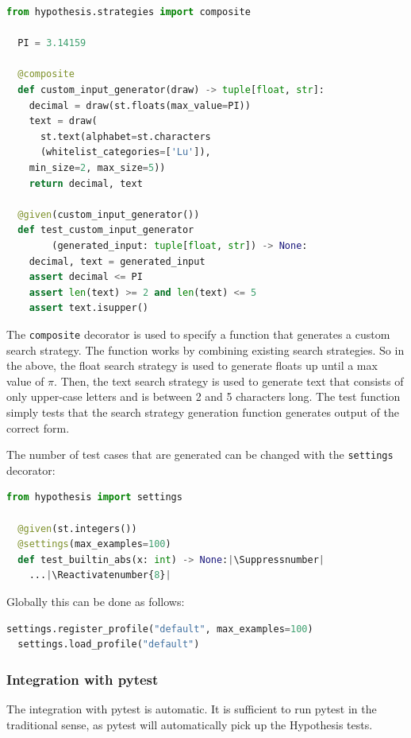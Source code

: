 \documentclass[runningheads]{llncs}
\makeatletter
\let\origthelstnumber\thelstnumber
\newcommand*\Suppressnumber{%
  \lst@AddToHook{OnNewLine}{%
    \let\thelstnumber\relax%
     \advance\c@lstnumber-\@ne\relax%
    }%
}
\newcommand*\Reactivatenumber[1]{%
  \setcounter{lstnumber}{\numexpr#1-1\relax}
  \lst@AddToHook{OnNewLine}{%
   \let\thelstnumber\origthelstnumber%
   \refstepcounter{lstnumber}%
  }%
}
\makeatother
\begin{document}
\begin{lstlisting}[language=Python,caption={Complex Inputs from code/tutorial.ipynb}]
  from hypothesis.strategies import composite

  PI = 3.14159

  @composite
  def custom_input_generator(draw) -> tuple[float, str]:
    decimal = draw(st.floats(max_value=PI))
    text = draw(
      st.text(alphabet=st.characters
      (whitelist_categories=['Lu']), 
    min_size=2, max_size=5))
    return decimal, text

  @given(custom_input_generator())
  def test_custom_input_generator
        (generated_input: tuple[float, str]) -> None:
    decimal, text = generated_input
    assert decimal <= PI
    assert len(text) >= 2 and len(text) <= 5
    assert text.isupper()
\end{lstlisting}
The \texttt{composite} decorator is used to specify a function that generates a custom search strategy. The function works by combining existing search strategies. So in the above, the float search strategy is used to generate floats up until a max value of $\pi$. Then, the text search strategy is used to generate text that consists of only upper-case letters and is between 2 and 5 characters long. The test function simply tests that the search strategy generation function generates output of the correct form.

\vspace{5mm}
\noindent The number of test cases that are generated can be changed with the \texttt{settings} decorator:

\begin{lstlisting}[language=Python,caption={??? from code/tutorial.ipynb}]
  from hypothesis import settings

  @given(st.integers())
  @settings(max_examples=100)
  def test_builtin_abs(x: int) -> None:|\Suppressnumber|
    ...|\Reactivatenumber{8}|

\end{lstlisting}

\noindent Globally this can be done as follows:
\begin{lstlisting}[language=Python,caption={??? from code/tutorial.ipynb}]
  settings.register_profile("default", max_examples=100)
  settings.load_profile("default")
\end{lstlisting}

\subsubsection{Integration with pytest}
The integration with pytest is automatic. It is sufficient to run pytest in the traditional sense, as pytest will automatically pick up the Hypothesis tests.
\end{document}
